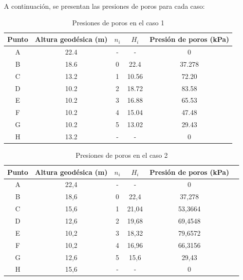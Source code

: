 \documentclass{article}
\begin{document}
\newpage

A continuación, se presentan las presiones de poros para cada caso:

\begin{table}[h!]
  \centering
  \begin{tabular}{ccccc}
    \hline
    \textbf{Punto} & \textbf{Altura geodésica (m)} & \textbf{$n_i$} & \textbf{$H_i$} & \textbf{Presión de poros (kPa)} \\
    \hline
    A & 22.4 & - & - &0 \\
    B & 18.6 &  0 & 22.4 &37.278 \\
    C & 13.2 & 1  & 10.56 &72.20 \\
    D & 10.2&  2 & 18.72 &83.58 \\
    E & 10.2 & 3  & 16.88 &65.53 \\
    F & 10.2 & 4  & 15.04 & 47.48\\
    G & 10.2 & 5  & 13.02 &29.43 \\
    H & 13.2 & - & - &0 \\
    \hline
  \end{tabular}
  \caption{Presiones de poros en el caso 1}
  \label{tab:presion1}
\end{table}


\begin{table}[h!]
  \centering
    \begin{tabular}{cccccc}
    \hline
    \textbf{Punto} & \textbf{Altura geodésica (m)} & \textbf{$n_i$} & \textbf{$H_i$} & \textbf{Presión de poros (kPa)} \\
    \hline
    A &  22,4 & - & - & 0  \\ 
    B &  18,6 & 0 & 22,4 & 37,278  \\ 
    C &  15,6 & 1 & 21,04 & 53,3664  \\ 
    D &  12,6 & 2 & 19,68 & 69,4548  \\ 
    E &  10,2 & 3 & 18,32 & 79,6572  \\ 
    F &  10,2 & 4 & 16,96 & 66,3156  \\ 
    G &  12,6 & 5 & 15,6 & 29,43  \\ 
    H &  15,6 & - & - & 0  \\ \hline
    \end{tabular}
  \caption{Presiones de poros en el caso 2}
  \label{tab:presion2}
\end{table}
  
\end{document}
